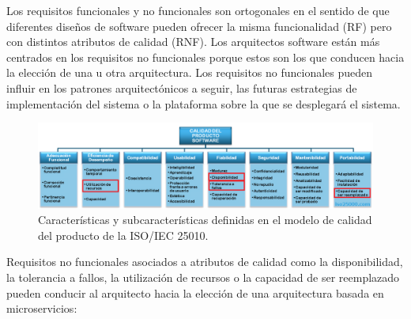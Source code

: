 \documentclass[11pt,spanish,listoffigures]{tfgetsinf}
\begin{document}
Los requisitos funcionales y no funcionales son ortogonales en el sentido de que diferentes diseños de software pueden ofrecer la misma funcionalidad (RF) pero con distintos atributos de calidad (RNF). Los arquitectos software están más centrados en los requisitos no funcionales porque estos son los que conducen hacia la elección de una u otra arquitectura. Los requisitos no funcionales pueden influir en los patrones arquitectónicos a seguir, las futuras estrategias de implementación del sistema o la plataforma sobre la que se desplegará el sistema. \cite{Ameller2013}

\begin{figure}[h]
\centering
\includegraphics[scale=0.5]{iso25010}
\caption{Características y subcaracterísticas definidas en el modelo de calidad del producto de la ISO/IEC 25010. \cite{Standard2010}}
\end{figure}

Requisitos no funcionales asociados a atributos de calidad como la disponibilidad, la tolerancia a fallos, la utilización de recursos o la capacidad de ser reemplazado pueden conducir al arquitecto hacia la elección de una arquitectura basada en microservicios:
\end{document}
